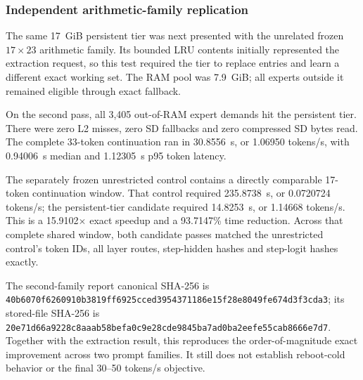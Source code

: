 \subsubsection{Independent arithmetic-family replication}

The same 17~GiB persistent tier was next presented with the unrelated frozen
$17\times23$ arithmetic family.  Its bounded LRU contents initially represented
the extraction request, so this test required the tier to replace entries and
learn a different exact working set.  The RAM pool was 7.9~GiB; all experts
outside it remained eligible through exact fallback.

On the second pass, all 3,405 out-of-RAM expert demands hit the persistent tier.
There were zero L2 misses, zero SD fallbacks and zero compressed SD bytes read.
The complete 33-token continuation ran in 30.8556~s, or 1.06950 tokens/s, with
0.94006~s median and 1.12305~s p95 token latency.

The separately frozen unrestricted control contains a directly comparable
17-token continuation window.  That control required 235.8738~s, or
0.0720724 tokens/s; the persistent-tier candidate required 14.8253~s, or
1.14668 tokens/s.  This is a 15.9102$\times$ exact speedup and a 93.7147\%
time reduction.  Across that complete shared window, both candidate passes
matched the unrestricted control's token IDs, all layer routes, step-hidden
hashes and step-logit hashes exactly.

The second-family report canonical SHA-256 is
\texttt{40b6070f6260910b3819ff6925cced3954371186e15f28e8049fe674d3f3cda3};
its stored-file SHA-256 is
\texttt{20e71d66a9228c8aaab58befa0c9e28cde9845ba7ad0ba2eefe55cab8666e7d7}.
Together with the extraction result, this reproduces the order-of-magnitude
exact improvement across two prompt families.  It still does not establish
reboot-cold behavior or the final 30--50 tokens/s objective.
